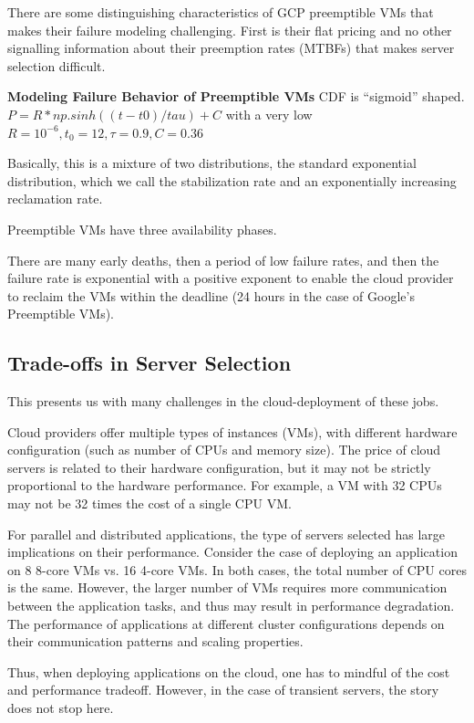 {There are some distinguishing characteristics of GCP preemptible VMs that makes their failure modeling challenging.
First is their flat pricing and no other signalling information about their preemption rates (MTBFs) that makes server selection difficult.

\textbf{Modeling Failure Behavior of Preemptible VMs}
CDF is ``sigmoid'' shaped.
$P=R*np.sinh((t-t0)/tau) + C$ with a very low $R=10^{-6}, t_0=12, \tau=0.9, C=0.36$

Basically, this is a mixture of two distributions, the standard exponential distribution, which we call the stabilization rate and an exponentially increasing reclamation rate.

Preemptible VMs have three availability phases.

There are many early deaths, then a period of low failure rates, and then the failure rate is exponential with a positive exponent to enable the cloud provider to reclaim the VMs within the deadline (24 hours in the case of Google's Preemptible VMs).



\subsection{Trade-offs in Server Selection}

This presents us with many challenges in the cloud-deployment of these jobs.

Cloud providers offer multiple types of instances (VMs), with different hardware configuration (such as number of CPUs and memory size).
The price of cloud servers is related to their hardware configuration, but it may not be strictly proportional to the hardware performance.
For example, a VM with 32 CPUs may not be 32 times the cost of a single CPU VM.


For parallel and distributed applications, the type of servers selected has large implications on their performance.
Consider the case of deploying an application on 8 8-core VMs vs. 16 4-core VMs.
In both cases, the total number of CPU cores is the same.
However, the larger number of VMs requires more communication between the application tasks, and thus may result in performance degradation.
The performance of applications at different cluster configurations depends on their communication patterns and scaling properties. 



Thus, when deploying applications on the cloud, one has to mindful of the cost and performance tradeoff.
However, in the case of transient servers, the story does not stop here. 


}

